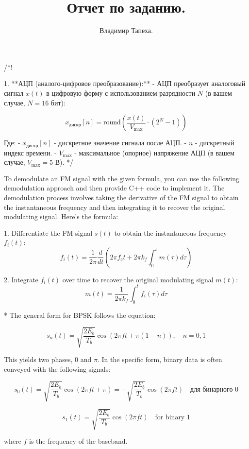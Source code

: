 \documentclass[14pt, a4paper]{extarticle}
\title{Отчет по заданию.}
\author{Владимир Тапеха.}
\begin{document}
\maketitle

/*!

1. **АЦП (аналого-цифровое преобразование):**
   - АЦП преобразует аналоговый сигнал \(x(t)\) в цифровую форму с использованием разрядности \(N\) (в вашем случае, \(N = 16\) бит):

     \[x_{\text{дискр}}[n] = \text{round}\left(\frac{x(t)}{V_{\text{max}}} \cdot (2^N - 1)\right)\]

     Где:
     - \(x_{\text{дискр}}[n]\) - дискретное значение сигнала после АЦП.
     - \(n\) - дискретный индекс времени.
     - \(V_{\text{max}}\) - максимальное (опорное) напряжение АЦП (в вашем случае, \(V_{\text{max}} = 5\) В).
*/

\newpage
To demodulate an FM signal with the given formula, you can use the following demodulation approach and then provide C++ code to implement it. The demodulation process involves taking the derivative of the FM signal to obtain the instantaneous frequency and then integrating it to recover the original modulating signal. Here's the formula:

1. Differentiate the FM signal \(s(t)\) to obtain the instantaneous frequency \(f_i(t)\):
\[f_i(t) = \frac{1}{2\pi} \frac{d}{dt}\left(2\pi f_c t + 2\pi k_f \int_{0}^{t} m(\tau) d\tau\right)\]

2. Integrate \(f_i(t)\) over time to recover the original modulating signal \(m(t)\):
\[m(t) = \frac{1}{2\pi k_f} \int_{0}^{t} f_i(\tau) d\tau\]

\par %

* The general form for BPSK follows the equation:

\[
s_{n}(t) = \sqrt{\frac{2E_{b}}{T_{b}}} \cos\left(2\pi ft + \pi(1-n)\right), \quad n=0,1
\]

This yields two phases, 0 and $\pi$. In the specific form, binary data is often conveyed with the following signals:

\[
s_{0}(t) = \sqrt{\frac{2E_{b}}{T_{b}}} \cos\left(2\pi ft + \pi\right) = -\sqrt{\frac{2E_{b}}{T_{b}}} \cos\left(2\pi ft\right) \quad \text{для бинарного 0}
\]

\[
s_{1}(t) = \sqrt{\frac{2E_{b}}{T_{b}}} \cos\left(2\pi ft\right) \quad \text{for binary 1}
\]

where \( f \) is the frequency of the baseband.
\end{document}
